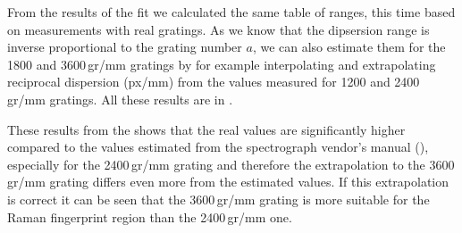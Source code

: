From the results of the fit we calculated the same table of ranges, this time
based on measurements with real gratings. As we know that the dipsersion range
is inverse proportional to the grating number $a$, we can also estimate
them for the 1800 and 3600\,gr/mm gratings by for example interpolating
and extrapolating reciprocal dispersion (px/mm) from the values measured for
1200 and 2400\,gr/mm gratings. All these results are in
.

\begin{table}
	\centering
	
	\caption{Spectrograph dispersion estimation. These are the same values as in
		but now calculated by fit of
		\cref{%
			\eqnlabel{spectrograph_selection:nu},%
			\eqnlabel{spectrograph_selection:spectral_range_max_meas},%
			\eqnlabel{spectrograph_selection:spectral_range_min_meas}%
		}
		to measured dispersions of 1200 and 2400\,gr/mm gratings which were then
		interpolated and extrapolated to 1800 and 3600\,gr/mm gratings,
		respectively. Gratings are denoted by number of grooves per mm,
		$\tilde{\nu}_1$ and $\tilde{\nu}_2$ are lowest and highest detected
		frequencies in \icm. The $\bar{d}$ denotes average dispersion in \icm/px
		calculated from
		.}
	\label{\tablabel{spectrograph_selection:dispersion_meas}}
\end{table}

These results from the
shows that the real values are significantly higher compared to the values
estimated from the spectrograph vendor's manual
(),
especially for the 2400\,gr/mm grating and therefore the extrapolation to the
3600\,gr/mm grating differs even more from the estimated values. If this
extrapolation is correct it can be seen that the 3600\,gr/mm grating is more
suitable for the Raman fingerprint region than the 2400\,gr/mm one.
